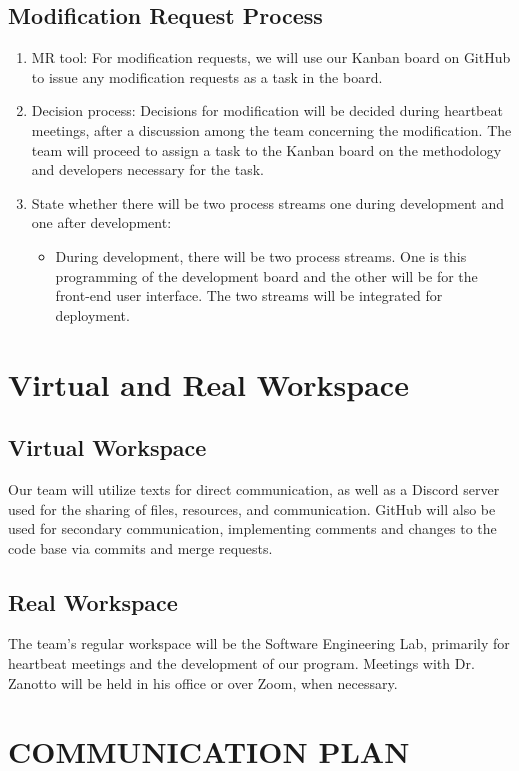 \subsection{Modification Request Process} 
\begin{enumerate}
\item MR tool: For modification requests, we will use our Kanban board on GitHub to issue any modification requests as a task in the board.
\item Decision process: Decisions for modification will be decided during heartbeat meetings, after a discussion among the team concerning the modification. The team will proceed to assign a task to the Kanban board on the methodology and developers necessary for the task.
\item State whether there will be two process streams one during development and one after development:
    \begin{itemize}
        \item During development, there will be two process streams. One is this programming of the development board and the other will be for the front-end user interface. The two streams will be integrated for deployment.
    \end{itemize}
\end{enumerate}

\section{Virtual and Real Workspace}
\subsection{Virtual Workspace}
Our team will utilize texts for direct communication, as well as a Discord server used for the sharing of files, resources, and communication. GitHub will also be used for secondary communication, implementing comments and changes to the code base via commits and merge requests.
\subsection{Real Workspace}
The team's regular workspace will be the Software Engineering Lab, primarily for heartbeat meetings and the development of our program. Meetings with Dr. Zanotto will be held in his office or over Zoom, when necessary.

\section{COMMUNICATION PLAN}

